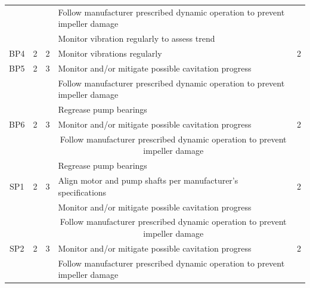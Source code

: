 \begin{table}[!h]
{\begin{tabular}{l|l|l|l|c}
\multicolumn{1}{c|}{} & \multicolumn{1}{c|}{} & \multicolumn{1}{c|}{} & Follow manufacturer prescribed dynamic operation to prevent impeller damage &  \\ 
\multicolumn{1}{c|}{} & \multicolumn{1}{c|}{} & \multicolumn{1}{c|}{} & Monitor vibration regularly to assess trend &  \\ 
\hline
\multicolumn{1}{c|}{BP4} & \multicolumn{1}{c|}{2} & \multicolumn{1}{c|}{2} & Monitor vibrations regularly & 2 \\ 
\hline
\multicolumn{1}{c|}{BP5} & \multicolumn{1}{c|}{2} & \multicolumn{1}{c|}{3} & Monitor and/or mitigate possible cavitation progress &  \\ 
\multicolumn{1}{c|}{} & \multicolumn{1}{c|}{} & \multicolumn{1}{c|}{} & Follow manufacturer prescribed dynamic operation to prevent impeller damage &  \\ 
\multicolumn{1}{c|}{} & \multicolumn{1}{c|}{} & \multicolumn{1}{c|}{} & Regrease pump bearings &  \\ 
\hline
\multicolumn{1}{c|}{BP6} & \multicolumn{1}{c|}{2} & \multicolumn{1}{c|}{3} & Monitor and/or mitigate possible cavitation progress & 2 \\ 
\multicolumn{1}{c|}{} & \multicolumn{1}{c|}{} & \multicolumn{1}{c|}{} & \multicolumn{1}{c|}{Follow manufacturer prescribed dynamic operation to prevent impeller damage} &  \\ 
\multicolumn{1}{c|}{} & \multicolumn{1}{c|}{} & \multicolumn{1}{c|}{} & Regrease pump bearings &  \\ 
\hline
\multicolumn{1}{c|}{SP1} & \multicolumn{1}{c|}{2} & \multicolumn{1}{c|}{3} & Align motor and pump shafts per manufacturer's specifications  & 2 \\ 
\multicolumn{1}{c|}{} & \multicolumn{1}{c|}{} & \multicolumn{1}{c|}{} & Monitor and/or mitigate possible cavitation progress &  \\ 
\multicolumn{1}{c|}{} & \multicolumn{1}{c|}{} & \multicolumn{1}{c|}{} & \multicolumn{1}{c|}{Follow manufacturer prescribed dynamic operation to prevent impeller damage} &  \\ 
\hline
\multicolumn{1}{c|}{SP2} & \multicolumn{1}{c|}{2} & \multicolumn{1}{c|}{3} & Monitor and/or mitigate possible cavitation progress & 2 \\ 
\multicolumn{1}{c|}{} & \multicolumn{1}{c|}{} & \multicolumn{1}{c|}{} & Follow manufacturer prescribed dynamic operation to prevent impeller damage &  \\ 
\hline
\end{tabular}

	}
\end{table}

